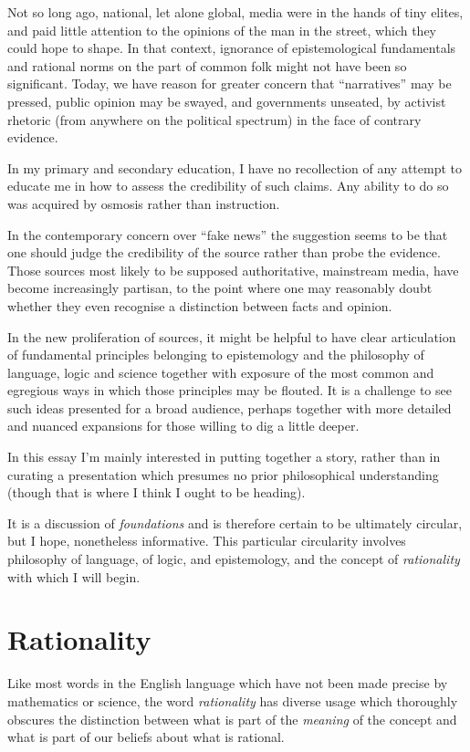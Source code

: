 \documentclass[10pt,titlepage]{article}
\begin{document}
Not so long ago, national, let alone global, media were in the hands of tiny elites, and paid little attention to the opinions of the man in the street, which they could hope to shape.
In that context, ignorance of epistemological fundamentals and rational norms on the part of common folk might not have been so significant.
Today, we have reason for greater concern that ``narratives'' may be pressed, public opinion may be swayed, and governments unseated, by activist rhetoric (from anywhere on the political spectrum) in the face of contrary evidence.

In my primary and secondary education, I have no recollection of any attempt to educate me in how to assess the credibility of such claims.
Any ability to do so was acquired by osmosis rather than instruction.

In the contemporary concern over ``fake news'' the suggestion seems to be that one should judge the credibility of the source rather than probe the evidence.
Those sources most likely to be supposed authoritative, mainstream media, have become increasingly partisan, to the point where one may reasonably doubt whether they even recognise a distinction between facts and opinion.

In the new proliferation of sources, it might be helpful to have clear articulation of fundamental principles belonging to epistemology and the philosophy of language, logic and science together with exposure of the most common and egregious ways in which those principles may be flouted.
It is a challenge to see such ideas presented for a broad audience, perhaps together with more detailed and nuanced expansions for those willing to dig a little deeper.

In this essay I'm mainly interested in putting together a story, rather than in curating a presentation which presumes no prior philosophical understanding (though that is where I think I ought to be heading).

It is a discussion of \emph{foundations} and is therefore certain to be ultimately circular, but I hope, nonetheless informative.
This particular circularity involves philosophy of language, of logic, and epistemology, and the concept of \emph{rationality} with which I will begin.

\section{Rationality}

Like most words in the English language which have not been made precise by mathematics or science, the word \emph{rationality} has diverse usage which thoroughly obscures the distinction between what is part of the \emph{meaning} of the concept and what is part of our beliefs about what is rational.
\end{document}

